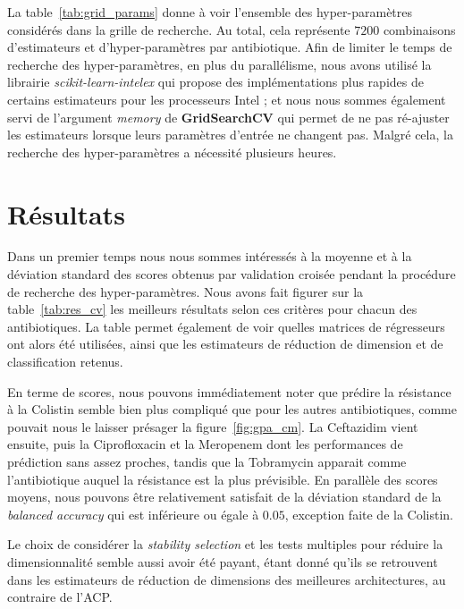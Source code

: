 \documentclass[11pt]{article}
\begin{document}
  La table~\ref{tab:grid_params} donne à voir l'ensemble des hyper-paramètres considérés dans la grille de recherche.
  Au total, cela représente $7200$ combinaisons d'estimateurs et d'hyper-paramètres par antibiotique.
  Afin de limiter le temps de recherche des hyper-paramètres, en plus du parallélisme, nous avons utilisé la librairie \textit{scikit-learn-intelex} qui propose des implémentations plus rapides de certains estimateurs pour les processeurs Intel ;
  et nous nous sommes également servi de l'argument \textit{memory} de \textbf{GridSearchCV} qui permet de ne pas ré-ajuster les estimateurs lorsque leurs paramètres d'entrée ne changent pas.
  Malgré cela, la recherche des hyper-paramètres a nécessité plusieurs heures.

\hypertarget{resultats}{%
\section{Résultats}\label{resultats}}

  Dans un premier temps nous nous sommes intéressés à la moyenne et à la déviation standard des scores obtenus par validation croisée pendant la procédure de recherche des hyper-paramètres.
  Nous avons fait figurer sur la table~\ref{tab:res_cv} les meilleurs résultats selon ces critères pour chacun des antibiotiques.
  La table permet également de voir quelles matrices de régresseurs ont alors été utilisées, ainsi que les estimateurs de réduction de dimension et de classification retenus.

  

  En terme de scores, nous pouvons immédiatement noter que prédire la résistance à la Colistin semble bien plus compliqué que pour les autres antibiotiques, comme pouvait nous le laisser présager la figure~\ref{fig:gpa_cm}.
  La Ceftazidim vient ensuite, puis la Ciprofloxacin et la Meropenem dont les performances de prédiction sans assez proches, tandis que la Tobramycin apparait comme l'antibiotique auquel la résistance est la plus prévisible.
  En parallèle des scores moyens, nous pouvons être relativement satisfait de la déviation standard de la \textit{balanced accuracy} qui est inférieure ou égale à $0.05$, exception faite de la Colistin.

  Le choix de considérer la \textit{stability selection} et les tests multiples pour réduire la dimensionnalité semble aussi avoir été payant, étant donné qu'ils se retrouvent dans les estimateurs de réduction de dimensions des meilleures architectures, au contraire de l'ACP.
\end{document}
